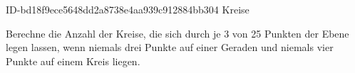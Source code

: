 \begin{exercise}
      {ID-bd18f9ece5648dd2a8738e4aa939c912884bb304}
      {Kreise}
  \ifproblem\problem\par
    Berechne die Anzahl der Kreise, die sich durch je 3 von 25 Punkten der
    Ebene legen lassen, wenn niemals drei Punkte auf einer Geraden und
    niemals vier Punkte auf einem Kreis liegen.
  \fi
\end{exercise}
